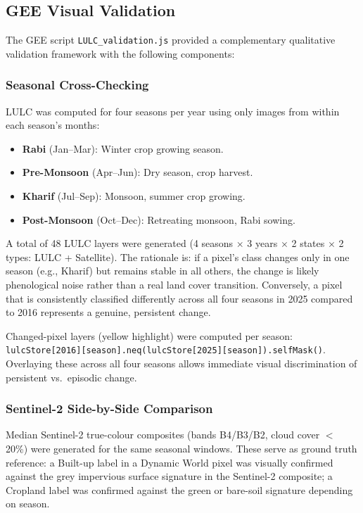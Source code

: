 \documentclass[12pt,a4paper]{article}
\begin{document}
\subsection{GEE Visual Validation}

The GEE script \texttt{LULC\_validation.js} provided a complementary qualitative validation framework with the following components:

\subsubsection{Seasonal Cross-Checking}
LULC was computed for four seasons per year using only images from within each season's months:
\begin{itemize}
    \item \textbf{Rabi} (Jan--Mar): Winter crop growing season.
    \item \textbf{Pre-Monsoon} (Apr--Jun): Dry season, crop harvest.
    \item \textbf{Kharif} (Jul--Sep): Monsoon, summer crop growing.
    \item \textbf{Post-Monsoon} (Oct--Dec): Retreating monsoon, Rabi sowing.
\end{itemize}

A total of 48 LULC layers were generated (4 seasons $\times$ 3 years $\times$ 2 states $\times$ 2 types: LULC + Satellite). The rationale is: if a pixel's class changes only in one season (e.g., Kharif) but remains stable in all others, the change is likely phenological noise rather than a real land cover transition. Conversely, a pixel that is consistently classified differently across all four seasons in 2025 compared to 2016 represents a genuine, persistent change.

Changed-pixel layers (yellow highlight) were computed per season: \texttt{lulcStore[2016][season].neq(lulcStore[2025][season]).selfMask()}. Overlaying these across all four seasons allows immediate visual discrimination of persistent vs.\ episodic change.

\subsubsection{Sentinel-2 Side-by-Side Comparison}
Median Sentinel-2 true-colour composites (bands B4/B3/B2, cloud cover $<$ 20\%) were generated for the same seasonal windows. These serve as ground truth reference: a Built-up label in a Dynamic World pixel was visually confirmed against the grey impervious surface signature in the Sentinel-2 composite; a Cropland label was confirmed against the green or bare-soil signature depending on season.
\end{document}

